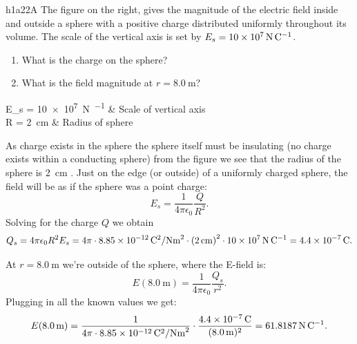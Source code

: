 
  \begin{problemwithimage}{h1a2}{2A}
    The figure on the right, gives the magnitude of the electric field inside and outside a sphere with a positive charge distributed uniformly throughout its volume.
    The scale of the vertical axis is set by $E_s = \qty{10e7}{\N\per\C}$.

    \begin{enumerate}
      \item What is the charge on the sphere?
      \item What is the field magnitude at $r = \qty{8,0}{\m}$?
    \end{enumerate}
  \end{problemwithimage}

  {\color{AUred}
  \begin{givens}
    E_s = \qty{10e7}{\N\per\C}  & Scale of vertical axis \\
    R = \qty{2}{\cm} & Radius of sphere
  \end{givens}

  \begin{derivation}
    As charge exists in the sphere the sphere itself must be insulating (no charge exists within a conducting sphere) from the figure we see that the radius of the sphere is \qty{2}{\cm} .
    Just on the edge (or outside) of a uniformly charged sphere, the field will be as if the sphere was a point charge:
    \begin{equation*}
      E_s = \frac{1}{4\pi \epsilon_0} \frac{Q}{R^2}
    .\end{equation*}
    Solving for the charge $Q$ we obtain
    \begin{equation*}
      Q_s = 4 \pi \epsilon_0 R^2 E_s = 4\pi \cdot \qty{8,85e-12}{\C^2\per\N\m^2}  \cdot \left( \qty{2}{\cm}  \right)^2 \cdot \qty{10e7}{\N\per\C} = \qty{4,4e-7}{\C} 
    .\end{equation*}
    
    At $r = \qty{8,0}{\m}$ we're outside of the sphere, where the E-field is:
    \begin{equation*}
      E(\qty{8,0}{\m})= \frac{1}{4\pi \epsilon_0} \frac{Q_s}{r^2}
    .\end{equation*}
    Plugging in all the known values we get:
    \begin{equation*}
      E (\qty{8,0}{\m} )= \frac{1}{4\pi \cdot \qty{8,85e-12}{\C^2\per\N\m^2} } \cdot \frac{\qty{4,4e-7}{\C}}{(\qty{8,0}{\m}) ^2} = \qty{61,8187}{\N\per\C} 
    .\end{equation*}
  \end{derivation}
}

